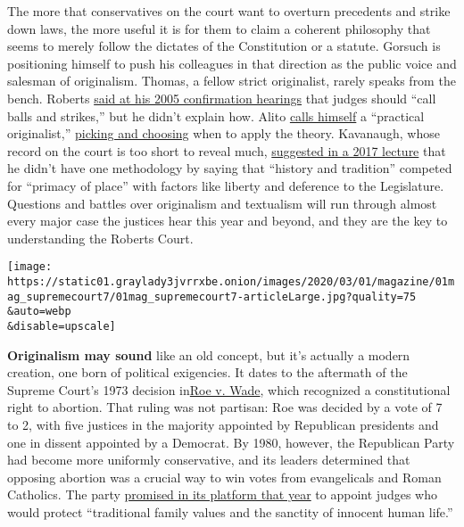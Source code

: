 The more that conservatives on the court want to overturn precedents and
strike down laws, the more useful it is for them to claim a coherent
philosophy that seems to merely follow the dictates of the Constitution
or a statute. Gorsuch is positioning himself to push his colleagues in
that direction as the public voice and salesman of originalism. Thomas,
a fellow strict originalist, rarely speaks from the bench. Roberts
\href{https://abcnews.go.com/Archives/video/sept-12-2005-john-roberts-baseball-analogy-10628259}{said
at his 2005 confirmation hearings} that judges should ``call balls and
strikes,'' but he didn't explain how. Alito
\href{https://www.yalelawjournal.com/forum/the-unitary-executive-and-the-scope-of-executive-power}{calls
himself} a ``practical originalist,''
\href{https://www.yalelawjournal.com//sam-alito-the-courts-most-consistent-conservative}{picking
and choosing} when to apply the theory. Kavanaugh, whose record on the
court is too short to reveal much,
\href{https://scholarship.law.nd.edu/cgi/viewcontent.cgi?article=4733\&context=ndlr}{suggested
in a 2017 lecture} that he didn't have one methodology by saying that
``history and tradition'' competed for ``primacy of place'' with factors
like liberty and deference to the Legislature. Questions and battles
over originalism and textualism will run through almost every major case
the justices hear this year and beyond, and they are the key to
understanding the Roberts Court.

\texttt{[image: https://static01.graylady3jvrrxbe.onion/images/2020/03/01/magazine/01mag\_supremecourt7/01mag\_supremecourt7-articleLarge.jpg?quality=75\\\&auto=webp\\\&disable=upscale]}

\textbf{Originalism may sound} like an old concept, but it's actually a
modern creation, one born of political exigencies. It dates to the
aftermath of the Supreme Court's 1973 decision
in\href{https://www.oyez.org/cases/1971/70-18}{Roe v. Wade}, which
recognized a constitutional right to abortion. That ruling was not
partisan: Roe was decided by a vote of 7 to 2, with five justices in the
majority appointed by Republican presidents and one in dissent appointed
by a Democrat. By 1980, however, the Republican Party had become more
uniformly conservative, and its leaders determined that opposing
abortion was a crucial way to win votes from evangelicals and Roman
Catholics. The party
\href{https://www.presidency.ucsb.edu/documents/republican-party-platform-1980}{promised
in its platform that year} to appoint judges who would protect
``traditional family values and the sanctity of innocent human life.''

